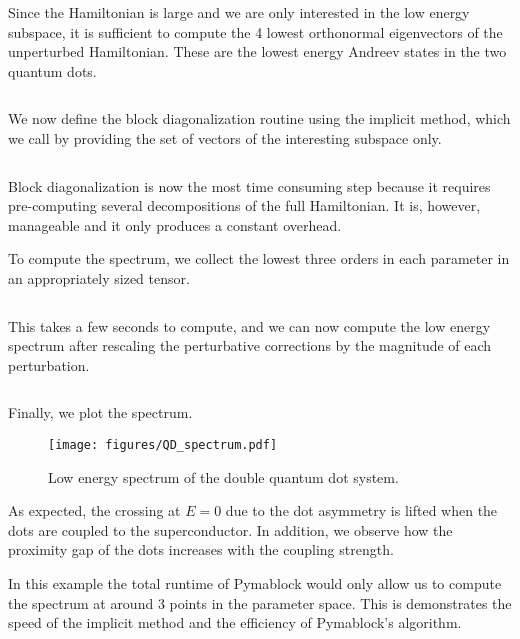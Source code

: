 Since the Hamiltonian is large and we are only interested in the low energy
subspace, it is sufficient to compute the 4 lowest orthonormal eigenvectors of
the unperturbed Hamiltonian.
These are the lowest energy Andreev states in the two quantum dots.
%
\inputminted[firstline=113, lastline=114]{ipython}{code_figures/lattice_system.py}
%
We now define the block diagonalization routine using the implicit method,
which we call by providing the set of vectors of the interesting subspace only.
%
\inputminted[firstline=116, lastline=116]{ipython}{code_figures/lattice_system.py}
%
Block diagonalization is now the most time consuming step because it requires
pre-computing several decompositions of the full Hamiltonian.
It is, however, manageable and it only produces a constant overhead.

To compute the spectrum, we collect the lowest three orders in each parameter
in an appropriately sized tensor.
%
\inputminted[firstline=118, lastline=121]{ipython}{code_figures/lattice_system.py}
%
This takes a few seconds to compute, and we can now compute the low energy
spectrum after rescaling the perturbative corrections by the magnitude of each
perturbation.
%
\inputminted[firstline=124, lastline=129]{ipython}{code_figures/lattice_system.py}
%
Finally, we plot the spectrum.
%
\begin{figure}[h!]
\centering
\texttt{[image: figures/QD\_spectrum.pdf]}
\caption{Low energy spectrum of the double quantum dot system.
}
\label{fig:QD_spectrum}
\end{figure}
%
As expected, the crossing at $E=0$ due to the dot asymmetry is lifted when the
dots are coupled to the superconductor.
In addition, we observe how the proximity gap of the dots increases with the
coupling strength.

In this example the total runtime of Pymablock would only allow us to compute
the spectrum at around 3 points in the parameter space.
This is demonstrates the speed of the implicit method and the efficiency of
Pymablock's algorithm.
